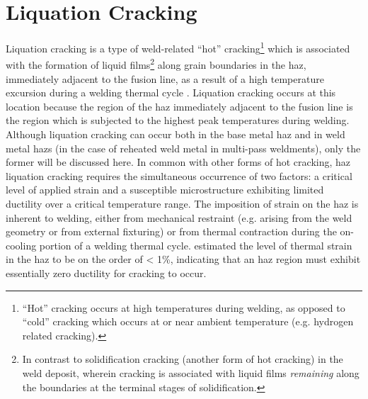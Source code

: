 \section{Liquation Cracking} \label{sec:liquation-cracking}
Liquation cracking is a type of weld-related “hot” cracking\footnote{“Hot” cracking occurs at high temperatures during welding, as opposed to “cold” cracking which occurs at or near ambient temperature (e.g. hydrogen related cracking).} which is associated with the formation of liquid films\footnote{In contrast to solidification cracking (another form of hot cracking) in the weld deposit, wherein cracking is associated with liquid films \emph{remaining} along the boundaries at the terminal stages of solidification.} along grain boundaries in the \gls{haz}, immediately adjacent to the fusion line, as a result of a high temperature excursion during a welding thermal cycle  \cite{lippold_welding_2014}. Liquation cracking occurs at this location because the region of the \gls{haz} immediately adjacent to the fusion line is the region which is subjected to the highest peak temperatures during welding. Although liquation cracking can occur both in the base metal \gls{haz} and in weld metal \gls{haz}s (in the case of reheated weld metal in multi-pass weldments), only the former will be discussed here. In common with other forms of hot cracking, \gls{haz} liquation cracking requires the simultaneous occurrence of two factors: a critical level of applied strain and a susceptible microstructure exhibiting limited ductility over a critical temperature range. The imposition of strain on the \gls{haz} is inherent to welding, either from mechanical restraint (e.g. arising from the weld geometry or from external fixturing) or from thermal contraction during the on-cooling portion of a welding thermal cycle. \citet{yeniscavich_correlation_1970} estimated the level of thermal strain in the \gls{haz} to be on the order of < 1\%, indicating that an \gls{haz} region must exhibit essentially zero ductility for cracking to occur. 


